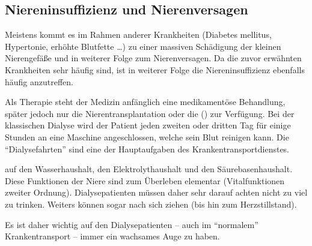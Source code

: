 \subsection{Niereninsuffizienz und Nierenversagen}
\label{topic:cni-therapie-dialyse}
\label{topic:dialysepatienten-gefahren}


Meistens kommt es im Rahmen anderer Krankheiten
(Diabetes mellitus, Hypertonie, erhöhte Blutfette \ldots) zu einer massiven
Schädigung der kleinen Nierengefäße und in weiterer Folge zum Nierenversagen. Da
die zuvor erwähnten Krankheiten sehr häufig sind, ist in weiterer Folge die
Niereninsuffizienz ebenfalls häufig anzutreffen. 

Als Therapie steht der
Medizin anfänglich eine medikamentöse Behandlung, später jedoch nur die
Nierentransplantation oder die 
() zur Verfügung. Bei der
klassischen Dialyse wird der Patient jeden zweiten oder
dritten Tag für einige Stunden an eine Maschine angeschlossen, welche sein
Blut reinigen kann. Die "`Dialysefahrten"' sind eine der
Hauptaufgaben des Krankentransportdienstes.

 auf den Wasserhaushalt, den
Elektrolythaushalt und den Säurebasenhaushalt. Diese Funktionen der Niere sind zum Überleben elementar (Vitalfunktionen zweiter
Ordnung). Dialysepatienten müssen daher sehr darauf achten
nicht zu viel zu trinken. Weiters können  sogar
 nach sich ziehen (bis hin
zum Herzstillstand).

Es ist daher wichtig auf den
Dialysepatienten -- auch im "`normalem"' Krankentransport --
immer ein wachsames Auge zu haben.







% 
% 
% 
% 
% 
% 
% 
% 




